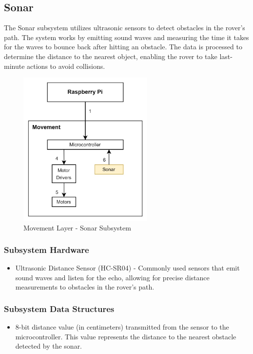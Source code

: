 \subsection{Sonar}
The Sonar subsystem utilizes ultrasonic sensors to detect obstacles in the rover's path. The system works by emitting sound waves and measuring the time it takes for the waves to bounce back after hitting an obstacle. The data is processed to determine the distance to the nearest object, enabling the rover to take last-minute actions to avoid collisions.

\begin{figure}[h!]
\centering
\includegraphics[width=0.60\textwidth]{images/movement/4_sonar.jpg}
\caption{Movement Layer - Sonar Subsystem}
\end{figure}

\subsubsection{Subsystem Hardware}
\begin{itemize}
    \item Ultrasonic Distance Sensor (HC-SR04) - Commonly used sensors that emit sound waves and listen for the echo, allowing for precise distance measurements to obstacles in the rover's path.
\end{itemize}

\subsubsection{Subsystem Data Structures}
\begin{itemize}
    \item 8-bit distance value (in centimeters) transmitted from the sensor to the microcontroller. This value represents the distance to the nearest obstacle detected by the sonar.
\end{itemize}

